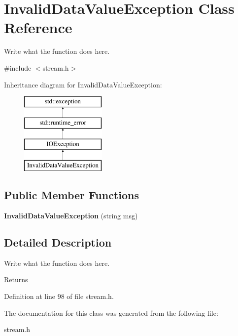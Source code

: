 \hypertarget{classInvalidDataValueException}{\section{Invalid\+Data\+Value\+Exception Class Reference}
\label{classInvalidDataValueException}
}


Write what the function does here.  




{\ttfamily \#include $<$stream.\+h$>$}

Inheritance diagram for Invalid\+Data\+Value\+Exception\+:\begin{figure}[H]
\begin{center}
\leavevmode
\includegraphics[height=4.000000cm]{classInvalidDataValueException}
\end{center}
\end{figure}
\subsection*{Public Member Functions}
\begin{DoxyCompactItemize}
\item 
\hypertarget{classInvalidDataValueException_a7f19492afda3de435899cce6c3b079ac}{{\bfseries Invalid\+Data\+Value\+Exception} (string msg)}\label{classInvalidDataValueException_a7f19492afda3de435899cce6c3b079ac}

\end{DoxyCompactItemize}


\subsection{Detailed Description}
Write what the function does here. 

\begin{DoxyReturn}{Returns}

\end{DoxyReturn}


Definition at line 98 of file stream.\+h.



The documentation for this class was generated from the following file\+:\begin{DoxyCompactItemize}
\item 
stream.\+h\end{DoxyCompactItemize}
